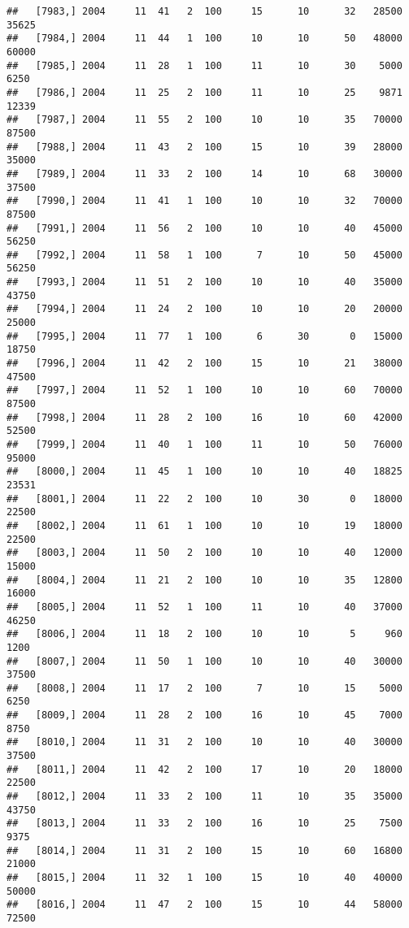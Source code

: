 \documentclass{article}\usepackage[]{graphicx}\usepackage[]{color}
\makeatletter
\newenvironment{kframe}{%
 \def\at@end@of@kframe{}%
 \ifinner\ifhmode%
  \def\at@end@of@kframe{\end{minipage}}%
  \begin{minipage}{\columnwidth}%
 \fi\fi%
 \def\FrameCommand##1{\hskip\@totalleftmargin \hskip-\fboxsep
 \colorbox{shadecolor}{##1}\hskip-\fboxsep
     \hskip-\linewidth \hskip-\@totalleftmargin \hskip\columnwidth}%
 \MakeFramed {\advance\hsize-\width
   \@totalleftmargin\z@ \linewidth\hsize
   \@setminipage}}%
 {\par\unskip\endMakeFramed%
 \at@end@of@kframe}
\newenvironment{knitrout}{}{} %
\makeatother
\begin{document}
\begin{knitrout}
\begin{kframe}
\begin{verbatim}
##   [7983,] 2004     11  41   2  100     15      10      32   28500   35625
##   [7984,] 2004     11  44   1  100     10      10      50   48000   60000
##   [7985,] 2004     11  28   1  100     11      10      30    5000    6250
##   [7986,] 2004     11  25   2  100     11      10      25    9871   12339
##   [7987,] 2004     11  55   2  100     10      10      35   70000   87500
##   [7988,] 2004     11  43   2  100     15      10      39   28000   35000
##   [7989,] 2004     11  33   2  100     14      10      68   30000   37500
##   [7990,] 2004     11  41   1  100     10      10      32   70000   87500
##   [7991,] 2004     11  56   2  100     10      10      40   45000   56250
##   [7992,] 2004     11  58   1  100      7      10      50   45000   56250
##   [7993,] 2004     11  51   2  100     10      10      40   35000   43750
##   [7994,] 2004     11  24   2  100     10      10      20   20000   25000
##   [7995,] 2004     11  77   1  100      6      30       0   15000   18750
##   [7996,] 2004     11  42   2  100     15      10      21   38000   47500
##   [7997,] 2004     11  52   1  100     10      10      60   70000   87500
##   [7998,] 2004     11  28   2  100     16      10      60   42000   52500
##   [7999,] 2004     11  40   1  100     11      10      50   76000   95000
##   [8000,] 2004     11  45   1  100     10      10      40   18825   23531
##   [8001,] 2004     11  22   2  100     10      30       0   18000   22500
##   [8002,] 2004     11  61   1  100     10      10      19   18000   22500
##   [8003,] 2004     11  50   2  100     10      10      40   12000   15000
##   [8004,] 2004     11  21   2  100     10      10      35   12800   16000
##   [8005,] 2004     11  52   1  100     11      10      40   37000   46250
##   [8006,] 2004     11  18   2  100     10      10       5     960    1200
##   [8007,] 2004     11  50   1  100     10      10      40   30000   37500
##   [8008,] 2004     11  17   2  100      7      10      15    5000    6250
##   [8009,] 2004     11  28   2  100     16      10      45    7000    8750
##   [8010,] 2004     11  31   2  100     10      10      40   30000   37500
##   [8011,] 2004     11  42   2  100     17      10      20   18000   22500
##   [8012,] 2004     11  33   2  100     11      10      35   35000   43750
##   [8013,] 2004     11  33   2  100     16      10      25    7500    9375
##   [8014,] 2004     11  31   2  100     15      10      60   16800   21000
##   [8015,] 2004     11  32   1  100     15      10      40   40000   50000
##   [8016,] 2004     11  47   2  100     15      10      44   58000   72500

\end{verbatim}
\end{kframe}
\end{knitrout}
\end{document}
